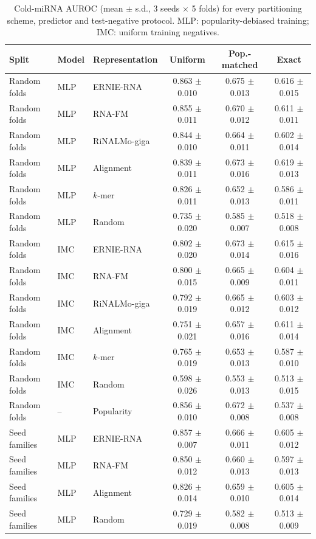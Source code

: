 \begin{longtable}{lllccc}
\caption{Cold-miRNA AUROC (mean $\pm$ s.d., 3 seeds $\times$ 5 folds) for every partitioning scheme, predictor and test-negative protocol. MLP: popularity-debiased training; IMC: uniform training negatives.}\label{tab:s3}\\
\toprule Split & Model & Representation & Uniform & Pop.-matched & Exact\\\midrule\endhead
Random folds & MLP & ERNIE-RNA & 0.863 $\pm$ 0.010 & 0.675 $\pm$ 0.013 & 0.616 $\pm$ 0.015\\
Random folds & MLP & RNA-FM & 0.855 $\pm$ 0.011 & 0.670 $\pm$ 0.012 & 0.611 $\pm$ 0.011\\
Random folds & MLP & RiNALMo-giga & 0.844 $\pm$ 0.010 & 0.664 $\pm$ 0.011 & 0.602 $\pm$ 0.014\\
Random folds & MLP & Alignment & 0.839 $\pm$ 0.011 & 0.673 $\pm$ 0.016 & 0.619 $\pm$ 0.013\\
Random folds & MLP & $k$-mer & 0.826 $\pm$ 0.011 & 0.652 $\pm$ 0.013 & 0.586 $\pm$ 0.011\\
Random folds & MLP & Random & 0.735 $\pm$ 0.020 & 0.585 $\pm$ 0.007 & 0.518 $\pm$ 0.008\\
Random folds & IMC & ERNIE-RNA & 0.802 $\pm$ 0.020 & 0.673 $\pm$ 0.014 & 0.615 $\pm$ 0.016\\
Random folds & IMC & RNA-FM & 0.800 $\pm$ 0.015 & 0.665 $\pm$ 0.009 & 0.604 $\pm$ 0.011\\
Random folds & IMC & RiNALMo-giga & 0.792 $\pm$ 0.019 & 0.665 $\pm$ 0.012 & 0.603 $\pm$ 0.012\\
Random folds & IMC & Alignment & 0.751 $\pm$ 0.021 & 0.657 $\pm$ 0.016 & 0.611 $\pm$ 0.014\\
Random folds & IMC & $k$-mer & 0.765 $\pm$ 0.019 & 0.653 $\pm$ 0.013 & 0.587 $\pm$ 0.010\\
Random folds & IMC & Random & 0.598 $\pm$ 0.026 & 0.553 $\pm$ 0.013 & 0.513 $\pm$ 0.015\\
Random folds & -- & Popularity & 0.856 $\pm$ 0.010 & 0.672 $\pm$ 0.008 & 0.537 $\pm$ 0.008\\
\midrule
Seed families & MLP & ERNIE-RNA & 0.857 $\pm$ 0.007 & 0.666 $\pm$ 0.011 & 0.605 $\pm$ 0.012\\
Seed families & MLP & RNA-FM & 0.850 $\pm$ 0.012 & 0.660 $\pm$ 0.013 & 0.597 $\pm$ 0.013\\
Seed families & MLP & Alignment & 0.826 $\pm$ 0.014 & 0.659 $\pm$ 0.010 & 0.605 $\pm$ 0.014\\
Seed families & MLP & Random & 0.729 $\pm$ 0.019 & 0.582 $\pm$ 0.008 & 0.513 $\pm$ 0.009\\

\end{longtable}
